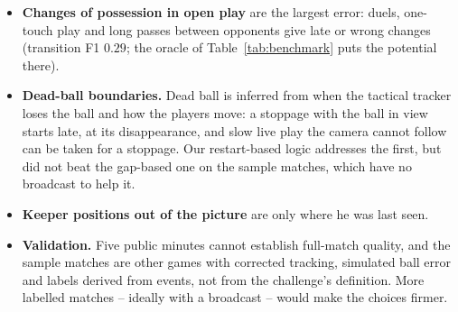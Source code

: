 \documentclass[11pt,a4paper]{article}
\begin{document}
\begin{itemize}[leftmargin=1.2em]
\item \textbf{Changes of possession in open play} are the largest error: duels, one-touch play
  and long passes between opponents give late or wrong changes (transition F1 $0.29$; the
  oracle of Table~\ref{tab:benchmark} puts the potential there).
\item \textbf{Dead-ball boundaries.} Dead ball is inferred from when the tactical tracker loses
  the ball and how the players move: a stoppage with the ball in view starts late, at its
  disappearance, and slow live play the camera cannot follow can be taken for a stoppage. Our
  restart-based logic addresses the first, but did not beat the gap-based one on the sample
  matches, which have no broadcast to help it.
\item \textbf{Keeper positions out of the picture} are only where he was last seen.
\item \textbf{Validation.} Five public minutes cannot establish full-match quality, and the
  sample matches are other games with corrected tracking, simulated ball error and labels
  derived from events, not from the challenge's definition. More labelled matches -- ideally with
  a broadcast -- would make the choices firmer.
\end{itemize}
\end{document}
